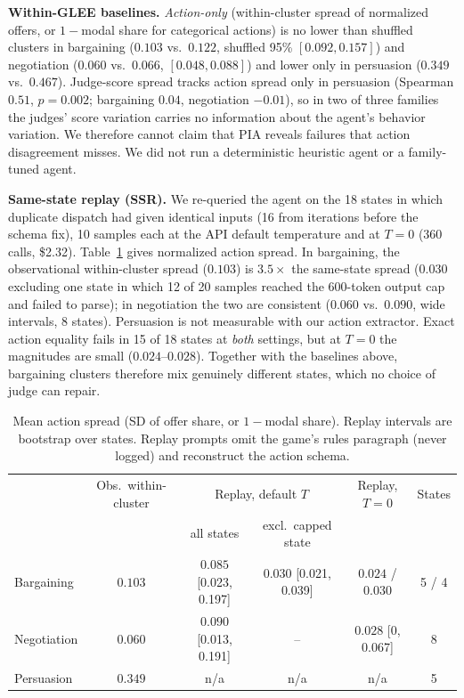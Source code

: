 \documentclass{article}
\begin{document}
\textbf{Within-GLEE baselines.} \emph{Action-only} (within-cluster spread of normalized offers, or $1-$modal share for categorical actions) is no lower than shuffled clusters in bargaining ($0.103$ vs.\ $0.122$, shuffled 95\% $[0.092,0.157]$) and negotiation ($0.060$ vs.\ $0.066$, $[0.048,0.088]$) and lower only in persuasion ($0.349$ vs.\ $0.467$). Judge-score spread tracks action spread only in persuasion (Spearman $0.51$, $p=0.002$; bargaining $0.04$, negotiation $-0.01$), so in two of three families the judges' score variation carries no information about the agent's behavior variation. We therefore cannot claim that PIA reveals failures that action disagreement misses. We did not run a deterministic heuristic agent or a family-tuned agent.

\textbf{Same-state replay (SSR).} We re-queried the agent on the 18 states in which duplicate dispatch had given identical inputs (16 from iterations before the schema fix), 10 samples each at the API default temperature and at $T=0$ (360 calls, \$2.32). Table~\ref{tab:replay} gives normalized action spread. In bargaining, the observational within-cluster spread ($0.103$) is $3.5\times$ the same-state spread ($0.030$ excluding one state in which 12 of 20 samples reached the 600-token output cap and failed to parse); in negotiation the two are consistent ($0.060$ vs.\ $0.090$, wide intervals, 8 states). Persuasion is not measurable with our action extractor. Exact action equality fails in 15 of 18 states at \emph{both} settings, but at $T=0$ the magnitudes are small ($0.024$--$0.028$). Together with the baselines above, bargaining clusters therefore mix genuinely different states, which no choice of judge can repair.

\begin{table}[t]
\footnotesize
\centering
\setlength{\tabcolsep}{4pt}
\begin{tabular}{lccccc}
\toprule
 & Obs.\ within-cluster & \multicolumn{2}{c}{Replay, default $T$} & Replay, $T{=}0$ & States \\
\cmidrule(lr){3-4}
 &  & all states & excl.\ capped state &  &  \\
\midrule
Bargaining  & $0.103$ & $0.085$ [0.023, 0.197] & $0.030$ [0.021, 0.039] & $0.024$ / $0.030$ & 5 / 4 \\
Negotiation & $0.060$ & $0.090$ [0.013, 0.191] & -- & $0.028$ [0, 0.067] & 8 \\
Persuasion  & $0.349$ & n/a & n/a & n/a & 5 \\
\bottomrule
\end{tabular}
\caption{Mean action spread (SD of offer share, or $1-$modal share). Replay intervals are bootstrap over states. Replay prompts omit the game's rules paragraph (never logged) and reconstruct the action schema.}
\label{tab:replay}
\end{table}
\end{document}
